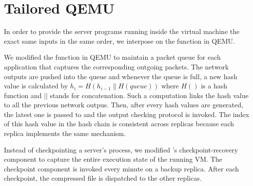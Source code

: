 \section{Tailored QEMU} \label{sec:qemu}

In order to provide the server programs running inside the virtual machine the exact same 
inputs in the same order, we interpose on the \tapsend function in QEMU.

We modified the \taprecv function in QEMU to maintain a packet queue for each application 
that captures the corresponding outgoing packets. The network outputs are pushed into the 
queue and whenever the queue is full, a new hash value is calculated by 
$h_i=H(h_{i-1}\|H(queue))$ where $H()$ is a hash function and $||$ stands for concatenation. 
Such a computation links the hash value to all the previous network outpus. Then, after every 
\thashcomp hash values are generated, the latest one is passed to \smrsystem and the output 
checking protocol is invoked. The index of this hash value in the hash chain is 
consistent across replicas because each replica implements the same mechanism. 

Instead of checkpointing a server's process, we modified \smrsystem's checkpoint-recovery 
component to capture the entire execution state of the running VM. The checkpoint component is 
invoked every minute on a backup replica. After each checkpoint, the compressed file is dispatched 
to the other replicas. 
